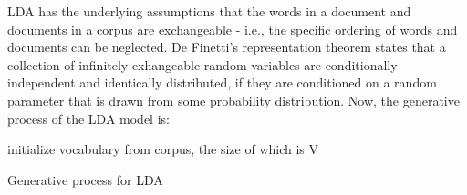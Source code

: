 \documentclass{article} %
\begin{document}

LDA has the underlying assumptions that the words in a document and documents
in a corpus are exchangeable - i.e., the specific ordering of words and
documents can be neglected. De Finetti's representation theorem states that
a collection of infinitely exhangeable random variables are conditionally 
independent and identically distributed, if they are conditioned on a random
parameter that is drawn from some probability distribution. Now, the generative
process of the LDA model is:

\begin{algorithm}
initialize vocabulary from corpus, the size of which is V\;
\caption{Generative process for LDA}
\end{algorithm}
\end{document}
